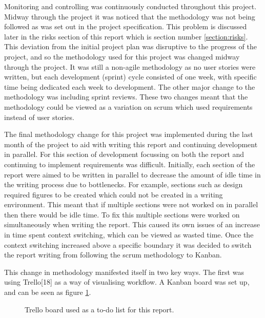 \documentclass{article}
\begin{document}
Monitoring and controlling was continuously conducted throughout this project. Midway through the project it was noticed that the methodology was not being followed as was set out in the project specification. This problem is discussed later in the risks section of this report which is section number \ref{section:risks}. This deviation from the initial project plan was disruptive to the progress of the project, and so the methodology used for this project was changed midway through the project. It was still a non-agile methodology as no user stories were written, but each development (sprint) cycle consisted of one week, with specific time being dedicated each week to development. The other major change to the methodology was including sprint reviews. These two changes meant that the methodology could be viewed as a variation on scrum which used requirements instead of user stories.\par

The final methodology change for this project was implemented during the last month of the project to aid with writing this report and continuing development in parallel. For this section of development focussing on both the report and continuing to implement requirements was difficult. Initially, each section of the report were aimed to be written in parallel to decrease the amount of idle time in the writing process due to bottlenecks. For example, sections such as design required figures to be created which could not be created in a writing environment. This meant that if multiple sections were not worked on in parallel then there would be idle time. To fix this multiple sections were worked on simultaneously when writing the report. This caused its own issues of an increase in time spent context switching, which can be viewed as wasted time. Once the context switching increased above a specific boundary it was decided to switch the report writing from following the scrum methodology to Kanban. \par

This change in methodology manifested itself in two key ways. The first was using Trello[18] as a way of visualising workflow. A Kanban board was set up, and can be seen as figure \ref{figure:trelloBoardOG}. 

\begin{figure}[H]
	\centering
	\caption{Trello board used as a to-do list for this report.}
	\label{figure:trelloBoardOG}
\end{figure}
\end{document}
